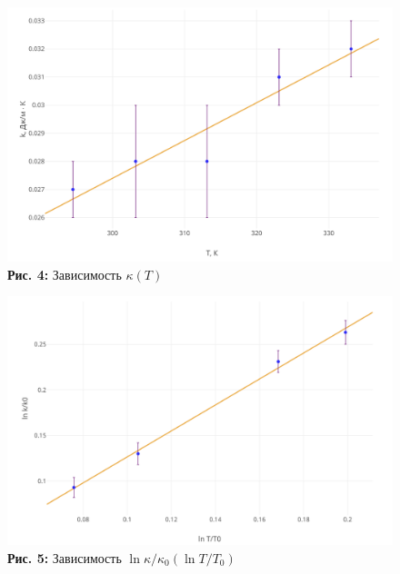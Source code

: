 \documentclass[12pt,a4paper]{scrartcl}
\begin{document}
	\begin{center}
		\begin{figure}[h]
			\begin{minipage}{0.5\linewidth}
				\begin{center}
					\includegraphics[scale=0.15]{PIC_4.png}
					\\\textbf{Рис. 4:} Зависимость $\kappa(T)$
				\end{center}
			\end{minipage}
			\begin{minipage}{0.5\linewidth}
				\begin{center}
					\includegraphics[scale=0.15]{PIC_5.png}
					\\\textbf{Рис. 5:} Зависимость $\ln \kappa/\kappa_0(\ln T/T_0)$
				\end{center}
			\end{minipage}
		\end{figure}
	\end{center}
	
\end{document}
